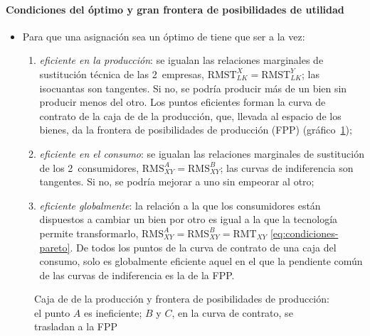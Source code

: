 \documentclass[11pt]{article}
\begin{document}
\paragraph{Condiciones del óptimo y gran frontera de posibilidades de utilidad}

\begin{itemize}
\item Para que una asignación sea un óptimo de  tiene que ser a la vez:
  \begin{enumerate}
  \item \emph{eficiente en la producción}: se igualan las relaciones marginales de sustitución técnica de las 2~empresas, $\mathrm{RMST}^X_{LK}=\mathrm{RMST}^Y_{LK}$; las isocuantas son tangentes. Si no, se podría producir más de un bien sin producir menos del otro. Los puntos eficientes forman la curva de contrato de la caja de  de la producción, que, llevada al espacio de los bienes, da la frontera de posibilidades de producción (FPP) (gráfico~\ref{fig:caja-edgeworth-fpp});
  \item \emph{eficiente en el consumo}: se igualan las relaciones marginales de sustitución de los 2~consumidores, $\mathrm{RMS}^A_{XY}=\mathrm{RMS}^B_{XY}$; las curvas de indiferencia son tangentes. Si no, se podría mejorar a uno sin empeorar al otro;
  \item \emph{eficiente globalmente}: la relación a la que los consumidores están dispuestos a cambiar un bien por otro es igual a la que la tecnología permite transformarlo, $\mathrm{RMS}^A_{XY}=\mathrm{RMS}^B_{XY}=\mathrm{RMT}_{XY}$ \eqref{eq:condiciones-pareto}. De todos los puntos de la curva de contrato de una caja del consumo, solo es globalmente eficiente aquel en el que la pendiente común de las curvas de indiferencia es la de la FPP.
  \end{enumerate}
\end{itemize}

\begin{figure}[H]
\centering
\caption{Caja de  de la producción y frontera de posibilidades de producción: el punto $A$ es ineficiente; $B$ y $C$, en la curva de contrato, se trasladan a la FPP}\label{fig:caja-edgeworth-fpp}
\end{figure}
\end{document}
